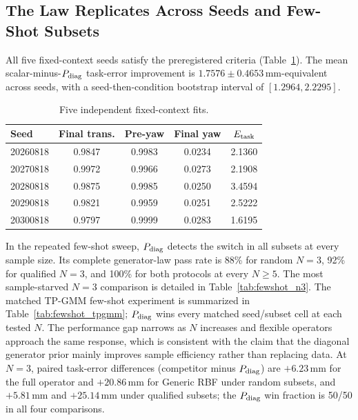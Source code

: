 \documentclass[letterpaper,10pt,conference]{ieeeconf}
\begin{document}
\subsection{The Law Replicates Across Seeds and Few-Shot Subsets}

All five fixed-context seeds satisfy the preregistered criteria
(Table~\ref{tab:multiseed}). The mean scalar-minus-$P_{\rm diag}$ task-error
improvement is $1.7576\pm0.4653$\,mm-equivalent across seeds, with a
seed-then-condition bootstrap interval of $[1.2964,2.2295]$.

\begin{table}[t]
\centering
\caption{Five independent fixed-context fits.}
\label{tab:multiseed}
\small
\setlength{\tabcolsep}{3.5pt}
\begin{tabular}{lcccc}
\toprule
Seed & Final trans. & Pre-yaw & Final yaw & $E_{\rm task}$\\
\midrule
20260818 & 0.9847 & 0.9983 & 0.0234 & 2.1360\\
20270818 & 0.9972 & 0.9966 & 0.0273 & 2.1908\\
20280818 & 0.9875 & 0.9985 & 0.0250 & 3.4594\\
20290818 & 0.9821 & 0.9959 & 0.0251 & 2.5222\\
20300818 & 0.9797 & 0.9999 & 0.0283 & 1.6195\\
\bottomrule
\end{tabular}
\end{table}

In the repeated few-shot sweep, $P_{\rm diag}$ detects the switch in all subsets
at every sample size. Its complete generator-law pass rate is 88\% for random
$N=3$, 92\% for qualified $N=3$, and 100\% for both protocols at every
$N\geq5$. The most sample-starved $N=3$ comparison is detailed in
Table~\ref{tab:fewshot_n3}. The matched TP-GMM few-shot experiment is summarized in
Table~\ref{tab:fewshot_tpgmm}; $P_{\rm diag}$ wins every matched seed/subset
cell at each tested $N$. The performance gap narrows as $N$ increases and
flexible operators approach the same response, which is consistent with the
claim that the diagonal generator prior mainly improves sample efficiency
rather than replacing data.
At $N=3$, paired task-error differences (competitor minus $P_{\rm diag}$) are
$+6.23$\,mm for the full operator and $+20.86$\,mm for Generic RBF under random
subsets, and $+5.81$\,mm and $+25.14$\,mm under qualified subsets; the
$P_{\rm diag}$ win fraction is 50/50 in all four comparisons.
\end{document}
